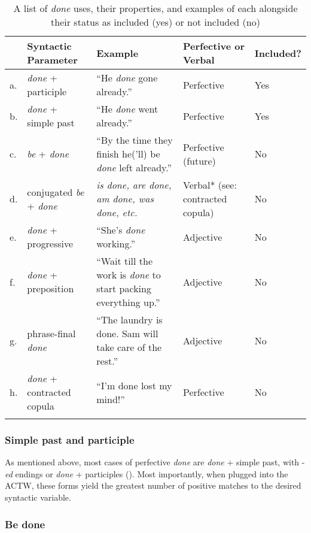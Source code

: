 \documentclass[output=paper,draftmode,colorlinks,citecolor=brown]{langscibook}
\begin{document}
\begin{table}
\small
\begin{tabularx}{\textwidth}{l@{~}lQQl}
\lsptoprule
 & {Syntactic Parameter} & {Example} & {Perfective or Verbal} & {Included?} \\
\midrule
a. & \textit{done} + participle & “He \textit{done} gone already.” & Perfective & Yes \\
b. & \textit{done} + simple past & “He \textit{done} went already.” & Perfective &  Yes \\
c. & \textit{be} + \textit{done} & “By the time they finish he('ll) be \textit{done} left already.” & Perfective (future) & No \\
d. & conjugated \textit{be} + \textit{done} & \textit{is done, are done, am done, was done, etc.} & Verbal* (see: contracted copula) & No \\
e. & \textit{done} + progressive & “She’s \textit{done} working.” & Adjective &  No \\
f. & \textit{done} + preposition & “Wait till the work is \textit{done} to start packing everything up.” & Adjective & No \\
g. & phrase-final \textit{done} & “The laundry is done.  Sam will take care of the rest.” & Adjective &  No \\
h. & \textit{done} + contracted copula & “I’m done lost my mind!” & Perfective &  No \\
\lspbottomrule
\end{tabularx}
\caption{\label{tab:baxter:1} A list of \textit{done} uses, their properties, and examples of each alongside their status as included (yes) or not included (no)}
\end{table}

\subsubsection{Simple past and participle}

As mentioned above, most cases of perfective \textit{done} are \textit{done} + simple past, with -\textit{ed} endings or \textit{done} + participles (\citealt{Green2002, Martin2018}). Most importantly, when plugged into the ACTW, these forms yield the greatest number of positive matches to the desired syntactic variable.

\subsubsection{Be done}\largerpage
\end{document}
